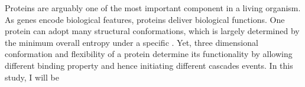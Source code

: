 Proteins are arguably one of the most important component in a living organism. As genes encode biological features, proteins deliver biological functions. One protein can adopt many structural conformations, which is largely determined by the minimum overall entropy under a specific . Yet, three dimensional conformation and flexibility of a protein determine its functionality by allowing different binding property and hence initiating different cascades events. In this study, I will be 